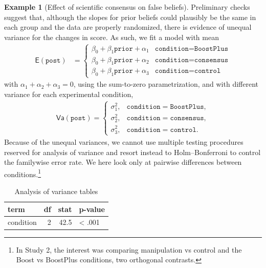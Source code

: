 \documentclass[
  11pt,
  letterpaper,
]{scrbook}
\theoremstyle{definition}
\newtheorem{example}{Example}[chapter]
\theoremstyle{remark}
\begin{document}
\begin{example}[Effect of scientific consensus on false
beliefs]
Preliminary checks suggest that, although the slopes for prior beliefs
could plausibly be the same in each group and the data are properly
randomized, there is evidence of unequal variance for the changes in
score. As such, we fit a model with mean \begin{align*}
\mathsf{E}(\texttt{post}) &= \begin{cases}
\beta_0 + \beta_1 \texttt{prior} + \alpha_1 &  \texttt{condition} = \texttt{BoostPlus}\\
\beta_0 + \beta_1 \texttt{prior} + \alpha_2 &\texttt{condition} = \texttt{consensus}\\
\beta_0 + \beta_1 \texttt{prior} + \alpha_3 &\texttt{condition} = \texttt{control}
\end{cases}
\end{align*} with \(\alpha_1 + \alpha_2 + \alpha_3=0\), using the
sum-to-zero parametrization, and with different variance for each
experimental condition, \begin{align*}
\mathsf{Va}(\texttt{post}) = \begin{cases}
\sigma^2_1, &  \texttt{condition} = \texttt{BoostPlus},\\
\sigma^2_2, &  \texttt{condition} = \texttt{consensus},\\
\sigma^2_3, & \texttt{condition} = \texttt{control}.
\end{cases}
\end{align*} Because of the unequal variances, we cannot use multiple
testing procedures reserved for analysis of variance and resort instead
to Holm--Bonferroni to control the familywise error rate. We here look
only at pairwise differences between conditions.\footnote{In Study 2,
  the interest was comparing manipulation vs control and the Boost vs
  BoostPlus conditions, two orthogonal contrasts.}

\begin{table}

\caption{\label{tbl-anovatabSSVB}Analysis of variance
tables}\begin{minipage}[t]{\linewidth}

{\centering 

\centering
\begin{tabular}[t]{lrrl}
\toprule
term & df & stat & p-value\\
\midrule
condition & 2 & 42.5 & < .001\\
\bottomrule
\end{tabular}

}
\end{minipage}
\end{table}
\end{example}
\end{document}

